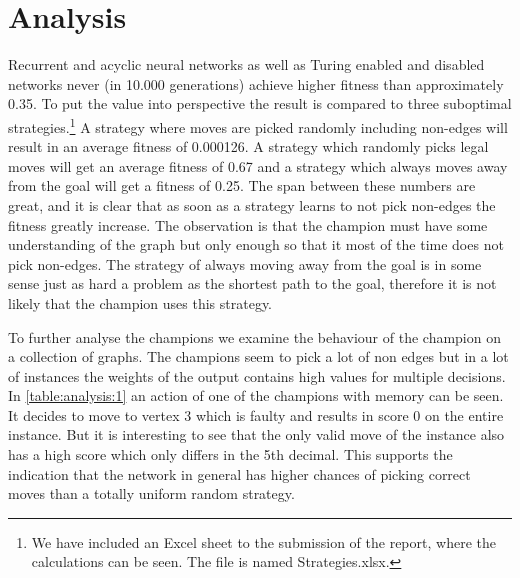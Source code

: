 
\section{Analysis}
Recurrent and acyclic neural networks as well as Turing enabled and disabled networks never (in 10.000 generations) achieve higher fitness than approximately 0.35. To put the value into perspective the result is compared to three suboptimal strategies.\footnote{We have included an Excel sheet to the submission of the report, where the calculations can be seen. The file is named Strategies.xlsx.} A strategy where moves are picked randomly including non-edges will result in an average fitness of 0.000126. A strategy which randomly picks legal moves will get an average fitness of 0.67 and a strategy which always moves away from the goal will get a fitness of 0.25. The span between these numbers are great, and it is clear that as soon as a strategy learns to not pick non-edges the fitness greatly increase. The observation is that the champion must have some understanding of the graph but only enough so that it most of the time does not pick non-edges. The strategy of always moving away from the goal is in some sense just as hard a problem as the shortest path to the goal, therefore it is not likely that the champion uses this strategy. 

\newpar To further analyse the champions we examine the behaviour of the champion on a collection of graphs. The champions seem to pick a lot of non edges but in a lot of instances the weights of the output contains high values for multiple decisions. In \autoref{table:analysis:1} an action of one of the champions with memory can be seen. It decides to move to vertex 3 which is faulty and results in score 0 on the entire instance. But it is interesting to see that the only valid move of the instance also has a high score which only differs in the 5th decimal. This supports the indication that the network in general has higher chances of picking correct moves than a totally uniform random strategy.

